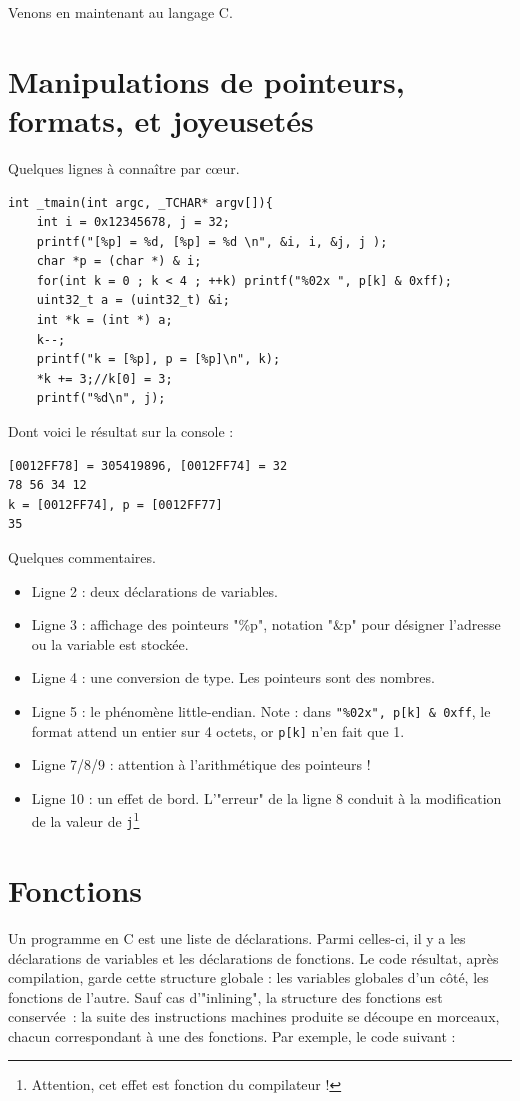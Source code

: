 \documentclass{book}
\newcommand{\code}[1]{\texttt{#1}}
\begin{document}
Venons en maintenant au langage C. 

\section{Manipulations de pointeurs, formats, et joyeusetés}

Quelques lignes à connaître par c\oe ur. 

\begin{verbatim}
int _tmain(int argc, _TCHAR* argv[]){
	int i = 0x12345678, j = 32;
	printf("[%p] = %d, [%p] = %d \n", &i, i, &j, j );
	char *p = (char *) & i;
	for(int k = 0 ; k < 4 ; ++k) printf("%02x ", p[k] & 0xff);
	uint32_t a = (uint32_t) &i;
	int *k = (int *) a;
	k--;
	printf("k = [%p], p = [%p]\n", k);
	*k += 3;//k[0] = 3;
	printf("%d\n", j);
\end{verbatim}

Dont voici le résultat sur la console : 

\begin{verbatim}
[0012FF78] = 305419896, [0012FF74] = 32
78 56 34 12 
k = [0012FF74], p = [0012FF77]
35
\end{verbatim}

Quelques commentaires. 

\begin{itemize}
	\item Ligne 2 : deux déclarations de variables.
	\item Ligne 3 : affichage des pointeurs "\%p", notation "\&p" pour désigner l'adresse ou la variable est stockée. 
	\item Ligne 4 : une conversion de type. Les pointeurs sont des nombres. 
	\item Ligne 5 : le phénomène little-endian. Note : dans \code{"\%02x", p[k] \& 0xff}, le format attend un entier sur 4 octets, or \code{p[k]} n'en fait que 1.
	\item Ligne 7/8/9 : attention à l'arithmétique des pointeurs !
	\item Ligne 10 : un effet de bord. L'"erreur" de la ligne 8 conduit à la modification de la valeur de \code{j}\footnote{Attention, cet effet est fonction du compilateur !}
\end{itemize}

\section{Fonctions}

Un programme en C est une liste de déclarations. Parmi celles-ci, il y a les déclarations de variables et les déclarations de fonctions. Le code résultat, après compilation, garde cette structure globale : les variables globales d'un côté, les fonctions de l'autre. Sauf cas d'"inlining", la structure des fonctions est conservée~: la suite des instructions machines produite se découpe en   morceaux, chacun correspondant à une des fonctions.  Par exemple, le code suivant : 
\end{document}
